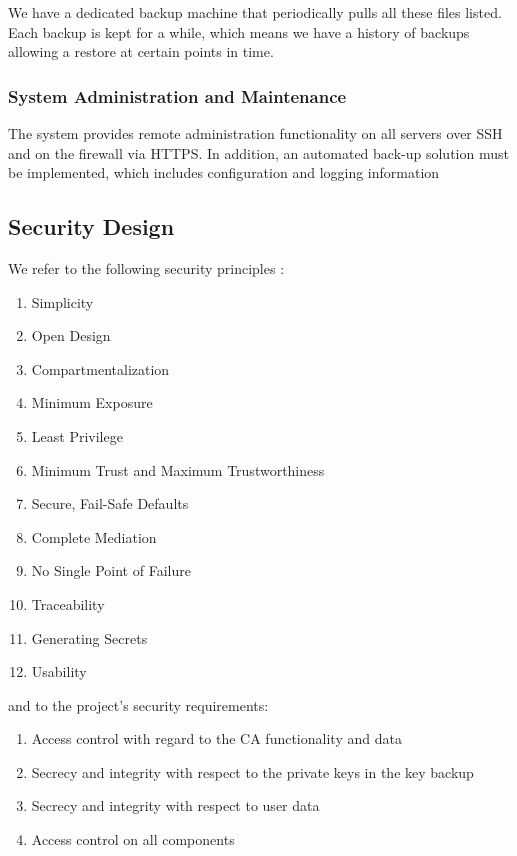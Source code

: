 \documentclass[english]{article}
\begin{document}
We have a dedicated backup machine that periodically pulls all these files listed. Each backup is kept for a while, which means we have a history of backups allowing a restore at certain points in time.

\subsubsection{System Administration and Maintenance}
The system provides remote administration functionality on all servers over SSH and on the firewall via HTTPS. In addition, an automated back-up solution must be implemented, which includes configuration and logging information

\subsection{Security Design}

We refer to the following security principles \cite{ASL_book}:
\begin{enumerate}
\setlength\itemsep{0em}
\item Simplicity
\item Open Design
\item Compartmentalization
\item Minimum Exposure
\item Least Privilege
\item Minimum Trust and Maximum Trustworthiness
\item Secure, Fail-Safe Defaults
\item Complete Mediation
\item No Single Point of Failure
\item Traceability
\item Generating Secrets
\item Usability
\end{enumerate}
and to the project's security requirements:
\begin{enumerate}[label=\alph*.]
\setlength\itemsep{0em}
\item Access control with regard to the CA functionality and data
\item Secrecy and integrity with respect to the private keys in the key backup
\item Secrecy and integrity with respect to user data
\item Access control on all components
\end{enumerate}

\end{document}
